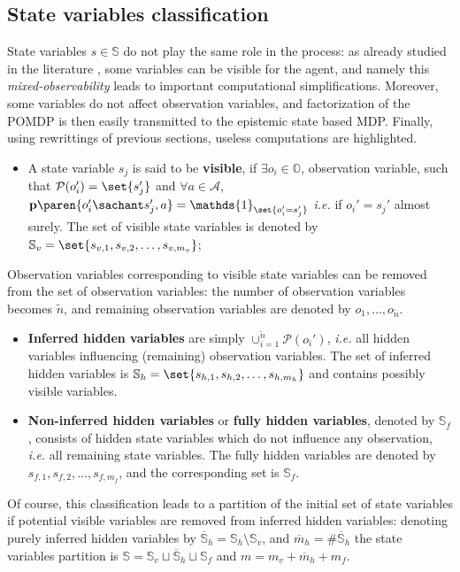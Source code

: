 \subsection{State variables classification}
\label{classif}
State variables $s \in \mathbb{S}$ do not play the same role
in the process: as already studied in the literature \cite{OngShaoHsuWee-IJRR10},
some variables can be visible for the agent, and namely this \textit{mixed-observability}
leads to important computational simplifications. Moreover, some variables do not
affect observation variables, and factorization of the POMDP is then easily transmitted
to the epistemic state based MDP. Finally, using rewrittings of previous sections,
useless computations are highlighted.
\begin{itemize}
\item A state variable $s_j$ is said to be \textbf{visible}, if $\exists o_i \in \mathbb{O}$, 
observation variable, such that $\mathcal{P}(o_i') = \set{ s_j' }$ 
and $\forall a \in \mathcal{A}$, $\textbf{p} \paren{ o_i' \sachant s_j',a } = \mathds{1}_{ \set{o_i' = s_j'}}$
\textit{i.e.} if $o_i' = s_j'$ almost surely. The set of visible state variables is denoted by 
$\mathbb{S}_v = \set{s_{v,1}, s_{v,2}, \ldots, s_{v,m_{v}}}$;
\end{itemize}

Observation variables corresponding to visible state variables can be removed 
from the set of observation variables: the number of observation variables becomes 
$\tilde{n}$, and remaining observation variables are denoted by $o_1,\ldots,o_{\tilde{n}}$.
\begin{itemize}
\item \textbf{Inferred hidden variables} are simply $\cup_{i=1}^{\tilde{n}} \mathcal{P}(o_i')$, 
\textit{i.e.} all hidden variables influencing (remaining) observation variables. The set of
inferred hidden variables is $\mathbb{S}_h = \set{s_{h,1},s_{h,2}, \ldots, s_{h,m_h}}$ and 
contains possibly visible variables.
\item \textbf{Non-inferred hidden variables} or \textbf{fully hidden variables}, denoted by $\mathbb{S}_f$, 
consists of hidden state variables which do not influence any observation, 
\textit{i.e.} all remaining state variables. The fully hidden variables are denoted by 
$s_{f,1},s_{f,2}, \ldots, s_{f,m_f}$, and the corresponding set is $\mathbb{S}_{f}$.
\end{itemize}
Of course, this classification leads to a partition of the initial set of state variables 
if potential visible variables are removed from
inferred hidden variables: denoting purely inferred hidden variables by $\overline{\mathbb{S}}_h = \mathbb{S}_h \setminus \mathbb{S}_v$, 
and $\overline{m}_h = \# \overline{\mathbb{S}}_h$ the state variables partition is 
$\mathbb{S} = \mathbb{S}_v \sqcup \overline{\mathbb{S}}_h \sqcup \mathbb{S}_f$ and $m = m_v + \overline{m}_h + m_f$.

